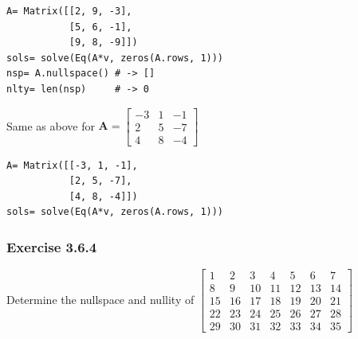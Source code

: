 \begin{verbatim}
A= Matrix([[2, 9, -3],
           [5, 6, -1],
           [9, 8, -9]])
sols= solve(Eq(A*v, zeros(A.rows, 1)))
nsp= A.nullspace() # -> []
nlty= len(nsp)     # -> 0
\end{verbatim}

Same as above for $\mathbf{A}= \left[\begin{matrix}-3 & 1 & -1\\2 & 5 & -7\\4 & 8 & -4\end{matrix}\right]$

\begin{verbatim}
A= Matrix([[-3, 1, -1],
           [2, 5, -7],
           [4, 8, -4]])
sols= solve(Eq(A*v, zeros(A.rows, 1)))
\end{verbatim}

\subsubsection{Exercise 3.6.4}

Determine the nullspace and nullity of
$\left[\begin{matrix}1 & 2 & 3 & 4 & 5 & 6 & 7\\
                     8 & 9 & 10 & 11 & 12 & 13 & 14\\
                     15 & 16 & 17 & 18 & 19 & 20 & 21\\
                     22 & 23 & 24 & 25 & 26 & 27 & 28\\
                     29 & 30 & 31 & 32 & 33 & 34 & 35\end{matrix}\right]$

